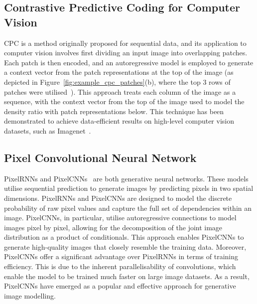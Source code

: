 \subsection{Contrastive Predictive Coding for Computer Vision}
\label{subsec:unsupervised_cpc_for_vision}
CPC is a method originally proposed for sequential data, and its application to computer vision involves first dividing an input image into overlapping patches. Each patch is then encoded, and an autoregressive model is employed to generate a context vector from the patch representations at the top of the image (as depicted in Figure~\ref{fig:example_cpc_patches}(b), where the top 3 rows of patches were utilised~\citep{oord2018representation}). This approach treats each column of the image as a sequence, with the context vector from the top of the image used to model the density ratio with patch representations below. This technique has been demonstrated to achieve data-efficient results on high-level computer vision datasets, such as Imagenet~\citep{deng2009imagenet}.

\subsection{Pixel Convolutional Neural Network}
\label{subsec:pixelcnn}
PixelRNNs and PixelCNNs~\citep{oord2016pixel} are both generative neural networks. These models utilise sequential prediction to generate images by predicting pixels in two spatial dimensions. PixelRNNs and PixelCNNs are designed to model the discrete probability of raw pixel values and capture the full set of dependencies within an image. PixelCNNs, in particular, utilise autoregressive connections to model images pixel by pixel, allowing for the decomposition of the joint image distribution as a product of conditionals. This approach enables PixelCNNs to generate high-quality images that closely resemble the training data. Moreover, PixelCNNs offer a significant advantage over PixelRNNs in terms of training efficiency. This is due to the inherent parallelisability of convolutions, which enable the model to be trained much faster on large image datasets. As a result, PixelCNNs have emerged as a popular and effective approach for generative image modelling.

